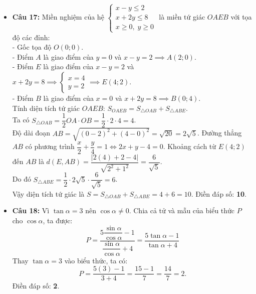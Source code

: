 \documentclass[12pt,a4paper]{article}
\begin{document}
\begin{itemize}[leftmargin=0.6cm]
    \item \textbf{Câu 17:} Miền nghiệm của hệ $\begin{cases} x - y \le 2 \\ x + 2y \le 8 \\ x \ge 0,\; y \ge 0 \end{cases}$ là miền tứ giác $OAEB$ với tọa độ các đỉnh:\\
    - Gốc tọa độ $O(0; 0)$.\\
    - Điểm $A$ là giao điểm của $y = 0$ và $x - y = 2 \implies A(2; 0)$.\\
    - Điểm $E$ là giao điểm của $x - y = 2$ và $x + 2y = 8 \implies \begin{cases} x = 4 \\ y = 2 \end{cases} \implies E(4; 2)$.\\
    - Điểm $B$ là giao điểm của $x = 0$ và $x + 2y = 8 \implies B(0; 4)$.\\
    Tính diện tích tứ giác $OAEB$:
    $S_{OAEB} = S_{\triangle OAB} + S_{\triangle ABE}$.\\
    Ta có $S_{\triangle OAB} = \dfrac{1}{2} OA \cdot OB = \dfrac{1}{2} \cdot 2 \cdot 4 = 4$.\\
    Độ dài đoạn $AB = \sqrt{(0-2)^2 + (4-0)^2} = \sqrt{20} = 2\sqrt{5}$. Đường thẳng $AB$ có phương trình $\dfrac{x}{2} + \dfrac{y}{4} = 1 \iff 2x + y - 4 = 0$. Khoảng cách từ $E(4; 2)$ đến $AB$ là $d(E, AB) = \dfrac{|2(4) + 2 - 4|}{\sqrt{2^2 + 1^2}} = \dfrac{6}{\sqrt{5}}$.\\
    Do đó $S_{\triangle ABE} = \dfrac{1}{2} \cdot 2\sqrt{5} \cdot \dfrac{6}{\sqrt{5}} = 6$.\\
    Vậy diện tích tứ giác là $S = S_{\triangle OAB} + S_{\triangle ABE} = 4 + 6 = 10$. Điền đáp số: \textbf{10}.

    \item \textbf{Câu 18:} Vì $\tan \alpha = 3$ nên $\cos \alpha \ne 0$. Chia cả tử và mẫu của biểu thức $P$ cho $\cos \alpha$, ta được:
    \[ P = \dfrac{5\dfrac{\sin \alpha}{\cos \alpha} - 1}{\dfrac{\sin \alpha}{\cos \alpha} + 4} = \dfrac{5\tan \alpha - 1}{\tan \alpha + 4} \]
    Thay $\tan \alpha = 3$ vào biểu thức, ta có:
    \[ P = \dfrac{5(3) - 1}{3 + 4} = \dfrac{15 - 1}{7} = \dfrac{14}{7} = 2. \]
    Điền đáp số: \textbf{2}.
\end{itemize}
\end{document}
